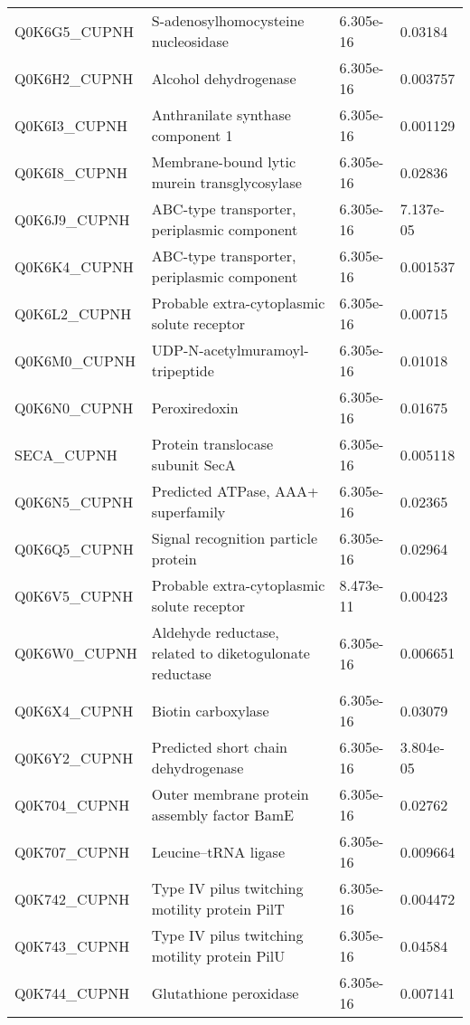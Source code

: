 \begin{center}
\begin{longtable}{ l l l l }
Q0K6G5\_CUPNH & S-adenosylhomocysteine nucleosidase& 6.305e-16 & 0.03184 \\ [0.5ex]
Q0K6H2\_CUPNH & Alcohol dehydrogenase& 6.305e-16 & 0.003757 \\ [0.5ex]
Q0K6I3\_CUPNH & Anthranilate synthase component 1& 6.305e-16 & 0.001129 \\ [0.5ex]
Q0K6I8\_CUPNH & Membrane-bound lytic murein transglycosylase& 6.305e-16 & 0.02836 \\ [0.5ex]
Q0K6J9\_CUPNH & ABC-type transporter, periplasmic component & 6.305e-16 & 7.137e-05 \\ [0.5ex]
Q0K6K4\_CUPNH & ABC-type transporter, periplasmic component& 6.305e-16 & 0.001537 \\ [0.5ex]
Q0K6L2\_CUPNH & Probable extra-cytoplasmic solute receptor& 6.305e-16 & 0.00715 \\ [0.5ex]
Q0K6M0\_CUPNH & UDP-N-acetylmuramoyl-tripeptide & 6.305e-16 & 0.01018 \\ [0.5ex]
Q0K6N0\_CUPNH & Peroxiredoxin& 6.305e-16 & 0.01675 \\ [0.5ex]
SECA\_CUPNH & Protein translocase subunit SecA& 6.305e-16 & 0.005118 \\ [0.5ex]
Q0K6N5\_CUPNH & Predicted ATPase, AAA+ superfamily& 6.305e-16 & 0.02365 \\ [0.5ex]
Q0K6Q5\_CUPNH & Signal recognition particle protein& 6.305e-16 & 0.02964 \\ [0.5ex]
Q0K6V5\_CUPNH & Probable extra-cytoplasmic solute receptor& 8.473e-11 & 0.00423 \\ [0.5ex]
Q0K6W0\_CUPNH & Aldehyde reductase, related to diketogulonate reductase& 6.305e-16 & 0.006651 \\ [0.5ex]
Q0K6X4\_CUPNH & Biotin carboxylase& 6.305e-16 & 0.03079 \\ [0.5ex]
Q0K6Y2\_CUPNH & Predicted short chain dehydrogenase& 6.305e-16 & 3.804e-05 \\ [0.5ex]
Q0K704\_CUPNH & Outer membrane protein assembly factor BamE& 6.305e-16 & 0.02762 \\ [0.5ex]
Q0K707\_CUPNH & Leucine--tRNA ligase& 6.305e-16 & 0.009664 \\ [0.5ex]
Q0K742\_CUPNH & Type IV pilus twitching motility protein PilT& 6.305e-16 & 0.004472 \\ [0.5ex]
Q0K743\_CUPNH & Type IV pilus twitching motility protein PilU& 6.305e-16 & 0.04584 \\ [0.5ex]
Q0K744\_CUPNH & Glutathione peroxidase& 6.305e-16 & 0.007141 \\ [0.5ex]

\end{longtable}
\end{center}
